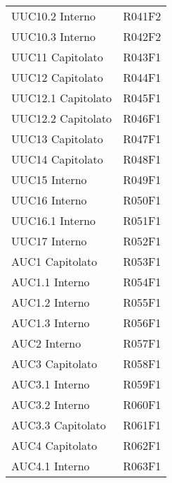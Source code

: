 \documentclass[../analisi-dei-requisiti.tex]{subfiles}
\begin{document}
\begin{longtable}[H]{ p{4cm} | p{4cm} }
  UUC10.2 Interno               & R041F2                               \\
  UUC10.3 Interno               & R042F2                               \\
  UUC11 Capitolato              & R043F1                               \\
  UUC12 Capitolato              & R044F1                               \\
  UUC12.1 Capitolato            & R045F1                               \\
  UUC12.2 Capitolato            & R046F1                               \\
  UUC13 Capitolato              & R047F1                               \\
  UUC14 Capitolato              & R048F1                               \\
  UUC15 Interno                 & R049F1                               \\
  UUC16 Interno                 & R050F1                               \\
  UUC16.1 Interno               & R051F1                               \\
  UUC17 Interno                 & R052F1                               \\
  AUC1 Capitolato               & R053F1                               \\
  AUC1.1 Interno                & R054F1                               \\
  AUC1.2 Interno                & R055F1                               \\
  AUC1.3 Interno                & R056F1                               \\
  AUC2 Interno                  & R057F1                               \\
  AUC3 Capitolato               & R058F1                               \\
  AUC3.1 Interno                & R059F1                               \\
  AUC3.2 Interno                & R060F1                               \\
  AUC3.3 Capitolato             & R061F1                               \\
  AUC4 Capitolato               & R062F1                               \\
  AUC4.1 Interno                & R063F1                               \\

\end{longtable}
\end{document}
